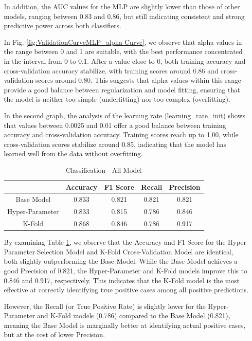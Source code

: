 In addition, the AUC values for the MLP are slightly lower than those of other models, ranging between 0.83 and 0.86, but still indicating consistent and strong predictive power across both classifiers.

In Fig. \ref{fig:ValidationCurveMLP_alpha Curve}, we observe that alpha values in the range between 0 and 1 are suitable, with the best performance concentrated in the interval from 0 to 0.1. After a value close to 0, both training accuracy and cross-validation accuracy stabilize, with training scores around 0.86 and cross-validation scores around 0.80. This suggests that alpha values within this range provide a good balance between regularization and model fitting, ensuring that the model is neither too simple (underfitting) nor too complex (overfitting).

In the second graph, the analysis of the learning rate (learning\_rate\_init) shows that values between 0.0025 and 0.01 offer a good balance between training accuracy and cross-validation accuracy. Training scores reach up to 1.00, while cross-validation scores stabilize around 0.85, indicating that the model has learned well from the data without overfitting.

\begin{table}[H]
    \centering
    \caption{Classification - All Model} 
    \begin{tabular}{||c| c c c c||} 
     \hline
     & Accuracy & F1 Score & Recall & Precision \\
     \hline\hline
     Base Model & 0.833 & 0.821 & 0.821 & 0.821 \\
     \hline
    Hyper-Parameter & 0.833 & 0.815 & 0.786 & 0.846 \\ 
    \hline
    K-Fold & 0.868 & 0.846 & 0.786 & 0.917 \\ 
    \hline
    \end{tabular}
    \label{tab:tab_MLPFinal}
\end{table}

By examining Table \ref{tab:tab_MLPFinal}, we observe that the Accuracy and F1 Score for the Hyper-Parameter Selection Model and K-Fold Cross-Validation Model are identical, both slightly outperforming the Base Model. While the Base Model achieves a good Precision of 0.821, the Hyper-Parameter and K-Fold models improve this to 0.846 and 0.917, respectively. This indicates that the K-Fold model is the most effective at correctly identifying true positive cases among all positive predictions.

However, the Recall (or True Positive Rate) is slightly lower for the Hyper-Parameter and K-Fold models (0.786) compared to the Base Model (0.821), meaning the Base Model is marginally better at identifying actual positive cases, but at the cost of lower Precision.

